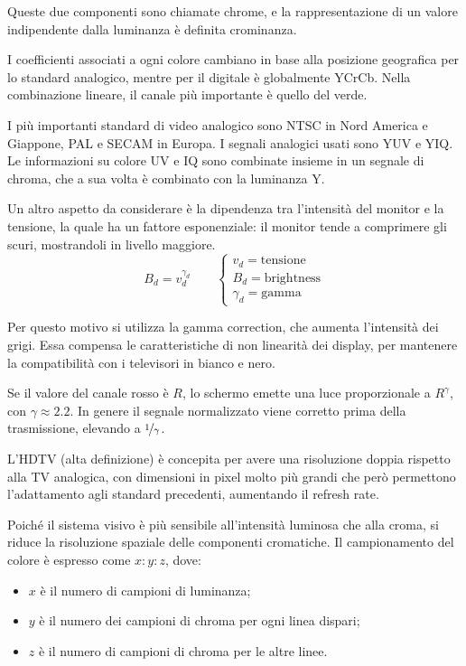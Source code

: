 Queste due componenti sono chiamate chrome, e la rappresentazione di un valore indipendente dalla luminanza è definita crominanza. 

I coefficienti associati a ogni colore cambiano in base alla posizione geografica per lo standard analogico, mentre per il digitale è globalmente YCrCb. Nella combinazione lineare, il canale più importante è quello del verde. 

I più importanti standard di video analogico sono NTSC in Nord America e Giappone, PAL e SECAM in Europa. I segnali analogici usati sono YUV e YIQ. Le informazioni su colore UV e IQ sono combinate insieme in un segnale di chroma, che a sua volta è combinato con la luminanza Y.

Un altro aspetto da considerare è la dipendenza tra l'intensità del monitor e la tensione, la quale ha un fattore esponenziale: il monitor tende a comprimere gli scuri, mostrandoli in livello maggiore.
$$B_d = v_d^{\gamma_d} \qquad \begin{cases}
v_d = \text{tensione} \\
B_d = \text{brightness} \\
\gamma_d = \text{gamma}
\end{cases}$$

Per questo motivo si utilizza la gamma correction, che aumenta l'intensità dei grigi. Essa compensa le caratteristiche di non linearità dei display, per mantenere la compatibilità con i televisori in bianco e nero.

Se il valore del canale rosso è $R$, lo schermo emette una luce proporzionale a $R^\gamma$, con $\gamma \approx 2.2$. In genere il segnale normalizzato viene corretto prima della trasmissione, elevando a $\nicefrac{1}{\gamma}$.

L'HDTV (alta definizione) è concepita per avere una risoluzione doppia rispetto alla TV analogica, con dimensioni in pixel molto più grandi che però permettono l'adattamento agli standard precedenti, aumentando il refresh rate. 

Poiché il sistema visivo è più sensibile all'intensità luminosa che alla croma, si riduce la risoluzione spaziale delle componenti cromatiche. Il campionamento del colore è espresso come $x : y : z$, dove:
\begin{itemize}
	\item $x$ è il numero di campioni di luminanza;
	\item $y$ è il numero dei campioni di chroma per ogni linea dispari;
	\item $z$ è il numero di campioni di chroma per le altre linee.
\end{itemize}

